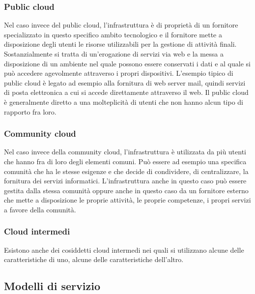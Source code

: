 \subsubsection{Public cloud}
Nel caso invece del public cloud, l'infrastruttura è di proprietà di un fornitore specializzato in questo specifico ambito tecnologico e il fornitore mette a disposizione degli utenti le risorse utilizzabili per la gestione di attività finali. Sostanzialmente si tratta di un'erogazione di servizi via web e la messa a disposizione di un ambiente nel quale possono essere conservati i dati e al quale si può accedere agevolmente attraverso i propri dispositivi. L'esempio tipico di public cloud è legato ad esempio alla fornitura di web server mail, quindi servizi di posta elettronica a cui si accede direttamente attraverso il web. Il public cloud è generalmente diretto a una molteplicità di utenti che non hanno alcun tipo di rapporto fra loro. 

\subsubsection{Community cloud}
Nel caso invece della community cloud, l'infrastruttura è utilizzata da più utenti che hanno fra di loro degli elementi comuni. Può essere ad esempio una specifica comunità che ha le stesse esigenze e che decide di condividere, di centralizzare, la fornitura dei servizi informatici. L'infrastruttura anche in questo caso può essere gestita dalla stessa comunità oppure anche in questo caso da un fornitore esterno che mette a disposizione le proprie attività, le proprie competenze, i propri servizi a favore della comunità. 

\subsubsection{Cloud intermedi}
Esistono anche dei cosiddetti cloud intermedi nei quali si utilizzano alcune delle caratteristiche di uno, alcune delle caratteristiche dell'altro. 

\subsection{Modelli di servizio}

